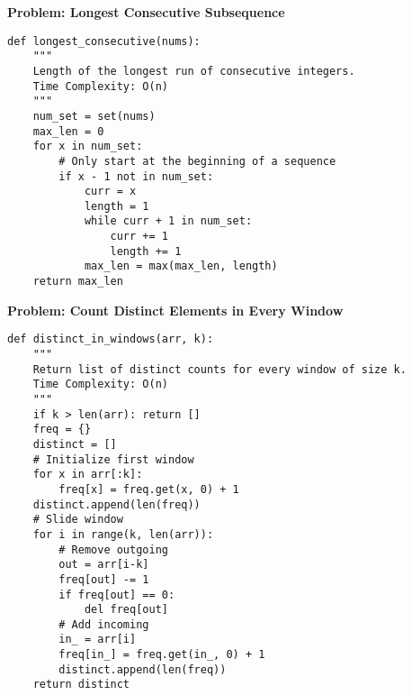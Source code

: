 \noindent\textbf{Problem: Longest Consecutive Subsequence}
\begin{verbatim}
def longest_consecutive(nums):
    """
    Length of the longest run of consecutive integers.
    Time Complexity: O(n)
    """
    num_set = set(nums)
    max_len = 0
    for x in num_set:
        # Only start at the beginning of a sequence
        if x - 1 not in num_set:
            curr = x
            length = 1
            while curr + 1 in num_set:
                curr += 1
                length += 1
            max_len = max(max_len, length)
    return max_len
\end{verbatim}

\noindent\textbf{Problem: Count Distinct Elements in Every Window}
\begin{verbatim}
def distinct_in_windows(arr, k):
    """
    Return list of distinct counts for every window of size k.
    Time Complexity: O(n)
    """
    if k > len(arr): return []
    freq = {}
    distinct = []
    # Initialize first window
    for x in arr[:k]:
        freq[x] = freq.get(x, 0) + 1
    distinct.append(len(freq))
    # Slide window
    for i in range(k, len(arr)):
        # Remove outgoing
        out = arr[i-k]
        freq[out] -= 1
        if freq[out] == 0:
            del freq[out]
        # Add incoming
        in_ = arr[i]
        freq[in_] = freq.get(in_, 0) + 1
        distinct.append(len(freq))
    return distinct
\end{verbatim}

